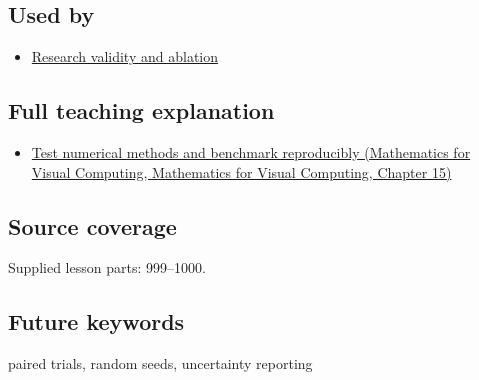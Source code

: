 \subsection{Used by}\label{appendix-b9db93e28371-used-by}

\begin{itemize}
\tightlist
\item
  \hyperref[appendix-65788587ef78]{Research validity and ablation}
\end{itemize}

\subsection{Full teaching explanation}\label{appendix-b9db93e28371-full-teaching-explanation}

\begin{itemize}
\tightlist
\item
  \href{../02-Mathematics-for-Visual-Computing/main.pdf\#nameddest=02-foundations-ii-ch031-test-numerical-methods-and-benchmark-reproducibly}{Test numerical methods and benchmark reproducibly (Mathematics for Visual Computing, Mathematics for Visual Computing, Chapter 15)}
\end{itemize}

\subsection{Source coverage}\label{appendix-b9db93e28371-source-coverage}

Supplied lesson parts: 999--1000.

\subsection{Future keywords}\label{appendix-b9db93e28371-future-keywords}

paired trials, random seeds, uncertainty reporting
